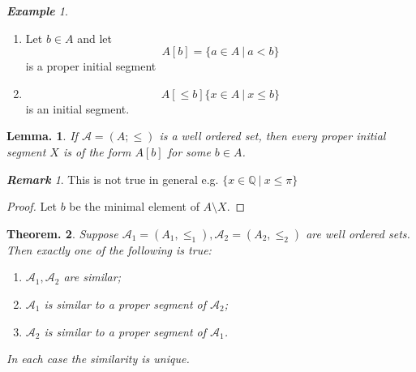 \documentclass[a4paper,oneside,11pt,DIV=12,parskip=half]{scrartcl}
\newcommand{\A}{\mathcal A}
\theoremstyle{plain}
\newtheorem{theorem}{Theorem.}[section]
\newtheorem{lemma}[theorem]{Lemma.}
\theoremstyle{definition}
\newtheorem{remark, definition}[theorem]{Remark and Definition.}
\newtheorem{lemma, definition}[theorem]{Lemma and Definition.}
\newtheorem{theorem, definition}[theorem]{Theorem and Definition.}
\theoremstyle{remark}
\newtheorem*{remark}{\textbf{Remark}}
\newtheorem*{example}{\textbf{Example}}
\newtheorem*{remark, example}{\textbf{Remark and Exercise}}
\begin{document}
\begin{example}
\begin{enumerate} 
    \item Let $b \in A$ and let
        \[ A[b] = \{ a \in A ~|~ a < b \} \] is a proper initial segment
    \item \[ A[\leq b] \{ x \in A ~|~ x \leq b \} \] is an initial segment.
\end{enumerate}
\end{example}

\begin{lemma}
If $\A = (A; \leq)$ is a well ordered set, then every proper initial segment $X$ is of the form $A[b]$ for some $b \in A$.
\end{lemma}

\begin{remark}
This is not true in general e.g. $\{ x \in \mathbb{Q} ~|~ x \leq \pi \}$
\end{remark}

\begin{proof}
Let $b$ be the minimal element of $A \setminus X$.
\end{proof}

\begin{theorem}\label{Th:compare_wellorders}
Suppose $\A_1 = (A_1,\leq_1), \A_2 = (A_2,\leq_2)$ are well ordered sets. Then exactly one of the following is true:
    \begin{enumerate}
        \item $\A_1,\A_2$ are similar;
        \item $\A_1$ is similar to a proper segment of $\A_2$;
        \item $\A_2$ is similar to a proper segment of $\A_1$.
    \end{enumerate}
In each case the similarity is unique.
\end{theorem}
\end{document}
